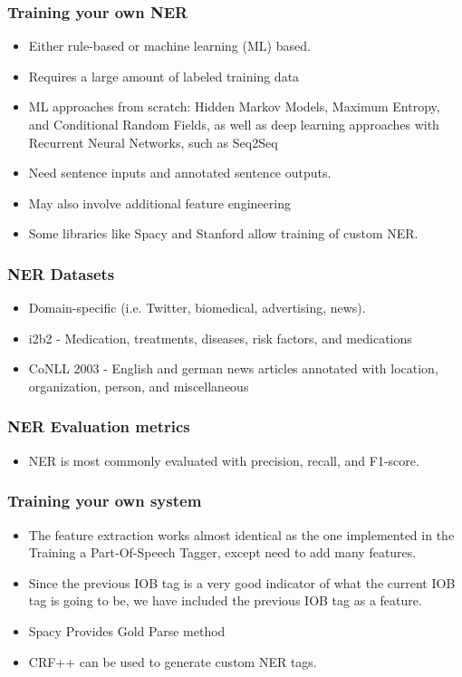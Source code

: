 \begin{frame}[fragile]\frametitle{Training your own NER}
  \begin{itemize}
  \item Either rule-based or machine learning (ML) based.
	\item Requires a large amount of labeled training data
	\item ML approaches from scratch: Hidden Markov Models, Maximum Entropy, and Conditional Random Fields, as well as deep learning approaches with Recurrent Neural Networks, such as Seq2Seq
	\item Need sentence inputs and annotated sentence outputs. 
	\item May also involve additional feature engineering
	\item Some libraries like Spacy and Stanford allow training of custom NER.
  \end{itemize}
\end{frame}


\begin{frame}[fragile]\frametitle{NER Datasets}
  \begin{itemize}
  \item Domain-specific (i.e. Twitter, biomedical, advertising, news).
	\item i2b2 - Medication, treatments, diseases, risk factors, and medications
	\item CoNLL 2003 - English and german news articles annotated with location, organization, person, and miscellaneous
  \end{itemize}
\end{frame}


\begin{frame}[fragile]\frametitle{NER Evaluation metrics}
  \begin{itemize}
  \item NER is most commonly evaluated with precision, recall, and F1-score.
  \end{itemize}
\end{frame}


\begin{frame}[fragile]\frametitle{Training your own system}
  \begin{itemize}
  \item The feature extraction works almost identical as the one implemented in the Training a Part-Of-Speech Tagger, except need to add many features.
  \item Since the previous IOB tag is a very good indicator of what the current IOB tag is going to be, we have included the previous IOB tag as a feature.
  \item Spacy Provides Gold Parse method
  \item CRF++ can be used to generate custom NER tags.
  \end{itemize}
\end{frame}

